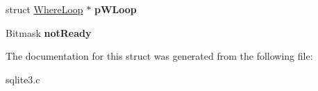 \begin{DoxyCompactItemize}
\begin{tabbing}
\end{tabbing}\item 
struct \hyperlink{structWhereLoop}{Where\+Loop} $\ast$ {\bfseries p\+W\+Loop}\hypertarget{structWhereLevel_ac40ed0531ae966eabe77e10f29fb56f3}{}\label{structWhereLevel_ac40ed0531ae966eabe77e10f29fb56f3}

\item 
Bitmask {\bfseries not\+Ready}\hypertarget{structWhereLevel_aed1e0964182444c84ceaad061acc473c}{}\label{structWhereLevel_aed1e0964182444c84ceaad061acc473c}

\end{DoxyCompactItemize}


The documentation for this struct was generated from the following file\+:\begin{DoxyCompactItemize}
\item 
sqlite3.\+c\end{DoxyCompactItemize}
